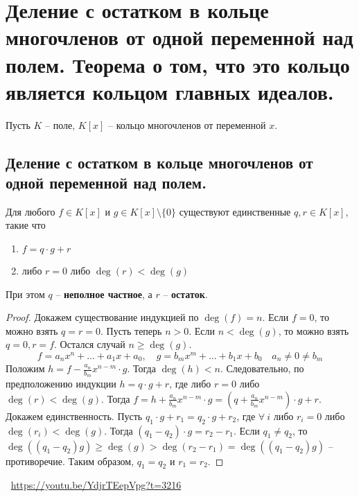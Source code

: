 \section{Деление с остатком в кольце многочленов от одной переменной над полем. Теорема о том, что это кольцо является кольцом главных идеалов.}
Пусть $K$ -- поле, $K[x]$ -- кольцо многочленов от переменной $x$.
\subsection{Деление с остатком в кольце многочленов от одной переменной над полем.}
\begin{theorem}
    Для любого $f \in K[x]$ и $g \in K[x] \setminus \{0\}$ существуют единственные $q, r \in K[x]$, такие что
    \begin{enumerate}
        \item $f = q \cdot g + r$
        \item либо $r = 0$ либо $\deg(r) < \deg(g)$
    \end{enumerate}
    При этом $q$ -- \textbf{неполное частное}, а $r$ -- \textbf{остаток}.
    \begin{proof}
        Докажем существование индукцией по $\deg(f) = n$. Если $f = 0$, то можно взять $q = r = 0$. Пусть теперь $n > 0$. Если $n < \deg(g)$, то можно взять $q = 0, r = f$. Остался случай $n \geqslant \deg(g)$.
        \[
            f = a_nx^n + ... + a_1x + a_0,
            \quad
            g = b_mx^m + ... + b_1x + b_0
            \quad
            a_n \neq 0 \neq b_m
        \]
        Положим $h = f - \frac{a_n}{b_m}x^{n-m} \cdot g$. Тогда $\deg(h) < n$. Следовательно, по предположению индукции $h = q \cdot g + r$, где либо $r = 0$ либо $\deg(r) < \deg(g)$. Тогда $f = h + \frac{a_n}{b_m}x^{n-m} \cdot g = \left( q + \frac{a_n}{b_m}x^{n-m} \right) \cdot g + r$. Докажем единственность. Пусть $q_1 \cdot g + r_1 = q_2 \cdot g + r_2$, где $\forall \> i$  либо $r_i = 0$ либо $\deg(r_i) < \deg(g)$. Тогда $(q_1 - q_2) \cdot g = r_2 - r_1$. Если $q_1 \neq q_2$, то $\deg((q_1 - q_2)g) \geqslant \deg(g) > \deg(r_2 - r_1) = \deg((q_1 - q_2)g)$ -- противоречие. Таким образом, $q_1 = q_2$ и $r_1 = r_2$.
    \end{proof}
\end{theorem}
\large \faYoutube \normalsize $\>$ \url{https://youtu.be/YdjrTEepVpg?t=3216}

